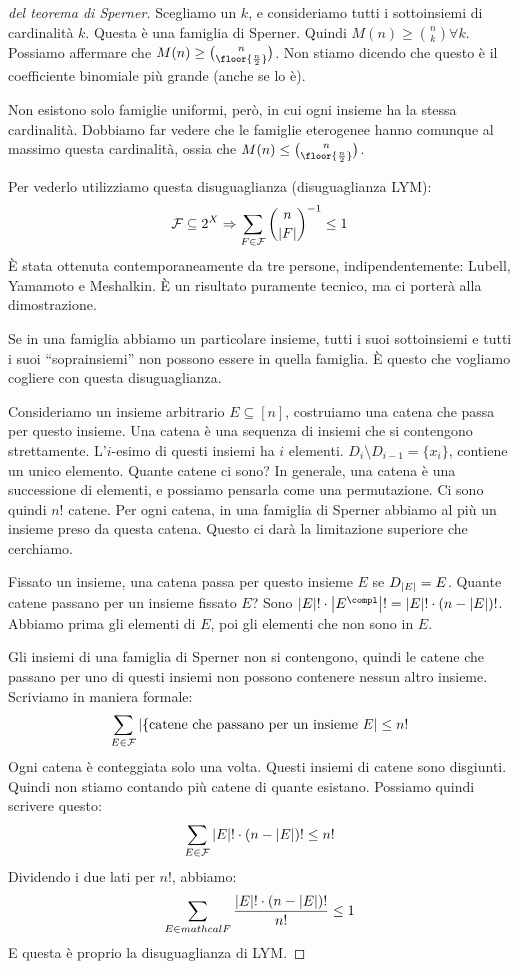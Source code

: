 	\begin{proof}[del teorema di Sperner]
		Scegliamo un $k$, e consideriamo tutti i sottoinsiemi di cardinalit\`a $k$.
		Questa \`e una famiglia di Sperner.
		Quindi $M(n) \ge \binom{n}{k} \forall k$.
		Possiamo affermare che $M(n) \ge \binom{n}{\floor{\frac{n}{2}}}$.
		Non stiamo dicendo che questo \`e il coefficiente binomiale pi\`u grande (anche se lo \`e).

		Non esistono solo famiglie uniformi, per\`o, in cui ogni insieme ha la stessa cardinalit\`a.
		Dobbiamo far vedere che le famiglie eterogenee hanno comunque al massimo questa cardinalit\`a, ossia che $M(n) \le \binom{n}{\floor{\frac{n}{2}}}$.

		Per vederlo utilizziamo questa disuguaglianza (disuguaglianza LYM):
		\[
			\mathcal{F} \subseteq 2^X \Rightarrow \sum_{F \in \mathcal{F}} \binom{n}{\left\lvert{F}\right\rvert}^{-1} \le 1
		\]
		\`E stata ottenuta contemporaneamente da tre persone, indipendentemente: Lubell, Yamamoto e Meshalkin.
		\`E un risultato puramente tecnico, ma ci porter\`a alla dimostrazione.

		Se in una famiglia abbiamo un particolare insieme, tutti i suoi sottoinsiemi e tutti i suoi ``soprainsiemi'' non possono essere in quella famiglia.
		\`E questo che vogliamo cogliere con questa disuguaglianza.

		Consideriamo un insieme arbitrario $E \subseteq [n]$, costruiamo una catena che passa per questo insieme.
		Una catena \`e una sequenza di insiemi che si contengono strettamente.
		L'$i$-esimo di questi insiemi ha $i$ elementi.
		$D_i \setminus D_{i-1} = \{ x_i \}$, contiene un unico elemento.
		Quante catene ci sono?
		In generale, una catena \`e una successione di elementi, e possiamo pensarla come una permutazione.
		Ci sono quindi $n!$ catene.
		Per ogni catena, in una famiglia di Sperner abbiamo al pi\`u un insieme preso da questa catena.
		Questo ci dar\`a la limitazione superiore che cerchiamo.

		Fissato un insieme, una catena passa per questo insieme $E$ se $D_{\left\lvert{E}\right\rvert} = E$.
		Quante catene passano per un insieme fissato $E$?
		Sono $\abs{E}! \cdot \abs{E^{\compl}}! = \abs{E}! \cdot (n - \abs{E})!$.
		Abbiamo prima gli elementi di $E$, poi gli elementi che non sono in $E$.

		Gli insiemi di una famiglia di Sperner non si contengono, quindi le catene che passano per uno di questi insiemi non possono contenere nessun altro insieme.
		Scriviamo in maniera formale:
		\[
			\sum_{E \in \mathcal{F}} \left\lvert{\{ \text{catene che passano per un insieme } E}\right\rvert \le n!
			\]
			Ogni catena \`e conteggiata solo una volta.
			Questi insiemi di catene sono disgiunti.
			Quindi non stiamo contando pi\`u catene di quante esistano.
			Possiamo quindi scrivere questo:
			\[
				\sum_{E \in \mathcal{F}} \left\lvert{E}\right\rvert! \cdot (n - \left\lvert{E}\right\rvert)! \le n!
			\]
			Dividendo i due lati per $n!$, abbiamo:
			\[
				\sum_{E \in mathcal{F}} \frac{\left\lvert{E}\right\rvert! \cdot (n - \left\lvert{E}\right\rvert)!}{n!} \le 1
			\]
			E questa \`e proprio la disuguaglianza di LYM.


\end{proof}
